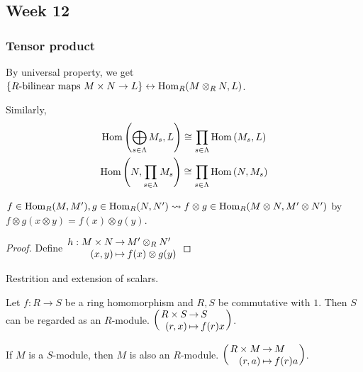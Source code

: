 \subsection{Week 12}
\subsubsection{Tensor product }

By universal property, we get
$\{ R\text{-bilinear maps~} M \times N \to L \} \leftrightarrow
\operatorname{Hom}_R(M \otimes_R N, L)$.

Similarly, 
\begin{gather*}
  \operatorname{Hom}\left(\bigoplus_{s\in \Lambda} M_s, L\right) \cong
  \prod_{s\in \Lambda} \operatorname{Hom}\left(M_s, L\right) \\
  \operatorname{Hom}\left(N, \prod_{s\in \Lambda} M_s\right) \cong
  \prod_{s\in \Lambda} \operatorname{Hom}\left(N, M_s\right) \\
\end{gather*}

\begin{fact}
  $f\in \operatorname{Hom}_R(M, M'), g \in \operatorname{Hom}_R(N, N') \leadsto
  f\otimes g \in \operatorname{Hom}_R(M\otimes N, M'\otimes N')$ by
  $f \otimes g(x \otimes y) = f(x) \otimes g(y)$.
  \begin{proof}
    Define
    $\arraycolsep=1pt
    \begin{array}{rcl}
      h: M \times N & \to & M' \otimes_R N' \\
      (x, y) & \mapsto & f(x) \otimes g(y)
    \end{array}$
  \end{proof}
\end{fact}

Restrition and extension of scalars.

Let $f: R \to S$ be a ring homomorphism and $R, S$ be commutative with $1$.
Then $S$ can be regarded as an $R$-module.
    $\arraycolsep=1pt
    \left(\begin{array}{rcl}
      R \times S & \to & S \\
      (r, x) & \mapsto & f(r)x
    \end{array}\right)$.

If $M$ is a $S$-module, then $M$ is also an $R$-module.
    $\arraycolsep=1pt
    \left(\begin{array}{rcl}
      R \times M & \to & M \\
      (r, a) & \mapsto & f(r)a
    \end{array}\right)$.

